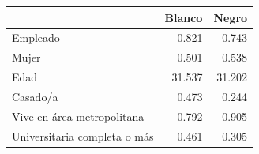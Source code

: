 \begin{table}
\centering
\begin{tabular}[t]{lrr}
\toprule
  & Blanco & Negro\\
\midrule
Empleado & 0.821 & 0.743\\
Mujer & 0.501 & 0.538\\
Edad & 31.537 & 31.202\\
Casado/a & 0.473 & 0.244\\
Vive en área metropolitana & 0.792 & 0.905\\
Universitaria completa o más & 0.461 & 0.305\\
\bottomrule
\end{tabular}
\end{table}
